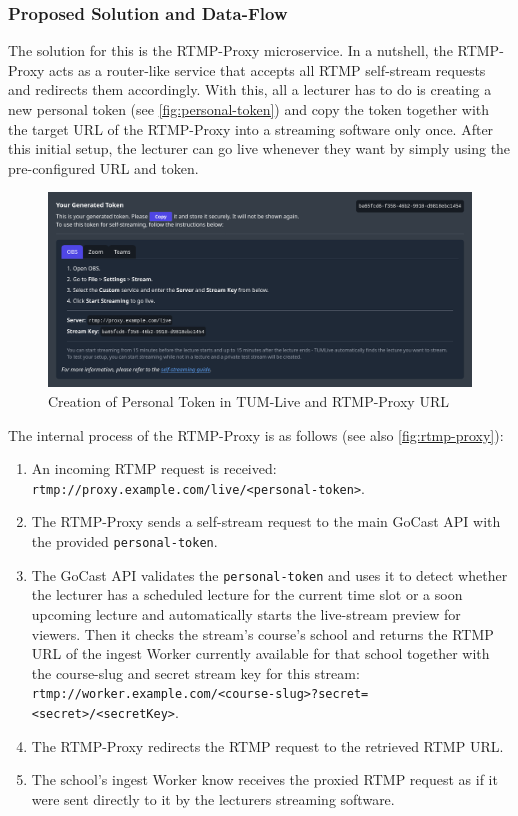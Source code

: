 \subsubsection{Proposed Solution and Data-Flow}

The solution for this is the RTMP-Proxy microservice. In a nutshell, the RTMP-Proxy acts as a router-like service that accepts all \ac{RTMP} self-stream requests and redirects them accordingly. With this, all a lecturer has to do is creating a new personal token (see \autoref{fig:personal-token}) and copy the token together with the target URL of the RTMP-Proxy into a streaming software only once.
After this initial setup, the lecturer can go live whenever they want by simply using the pre-configured URL and token.

\begin{figure}[htpb]
    \centering
    \includegraphics[width=\textwidth]{images/PersonalToken.png}
    \caption[Creation of Personal Token in TUM-Live and RTMP-Proxy URL]{Creation of Personal Token in TUM-Live and RTMP-Proxy URL}\label{fig:personal-token}
\end{figure}


The internal process of the RTMP-Proxy is as follows (see also \autoref{fig:rtmp-proxy}): 

\begin{enumerate}
    \item An incoming \ac{RTMP} request is received:\\
    \texttt{rtmp://proxy.example.com/live/<personal-token>}.
    \item The RTMP-Proxy sends a self-stream request to the main GoCast \ac{API} with the provided \texttt{personal-token}.
    \item The GoCast \ac{API} validates the \texttt{personal-token} and uses it to detect whether the lecturer has a scheduled lecture for the current time slot or a soon upcoming lecture and automatically starts the live-stream preview for viewers. Then it checks the stream's course's school and returns the \ac{RTMP} URL of the ingest Worker currently available for that school together with the course-slug and secret stream key for this stream: \\ 
    \texttt{rtmp://worker.example.com/<course-slug>?secret=<secret>/<secretKey>}.
    \item The RTMP-Proxy redirects the \ac{RTMP} request to the retrieved \ac{RTMP} URL.
    \item The school's ingest Worker know receives the proxied \ac{RTMP} request as if it were sent directly to it by the lecturers streaming software.
\end{enumerate}

